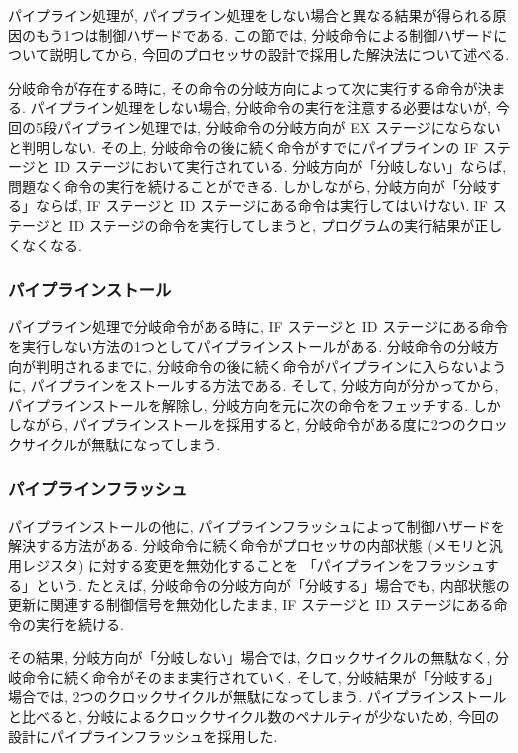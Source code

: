 \documentclass[../specifications.tex]{subfiles}
\begin{document}
  パイプライン処理が, 
  パイプライン処理をしない場合と異なる結果が得られる原因のもう1つは制御ハザードである.
  この節では, 分岐命令による制御ハザードについて説明してから, 
  今回のプロセッサの設計で採用した解決法について述べる.

  分岐命令が存在する時に, その命令の分岐方向によって次に実行する命令が決まる.
  パイプライン処理をしない場合, 分岐命令の実行を注意する必要はないが, 
  今回の5段パイプライン処理では, 分岐命令の分岐方向が EX ステージにならないと判明しない.
  その上, 分岐命令の後に続く命令がすでにパイプラインの IF ステージと ID ステージにおいて実行されている.
  分岐方向が「分岐しない」ならば, 問題なく命令の実行を続けることができる.
  しかしながら, 分岐方向が「分岐する」ならば, IF ステージと ID ステージにある命令は実行してはいけない.
  IF ステージと ID ステージの命令を実行してしまうと, プログラムの実行結果が正しくなくなる.

  \subsubsection{パイプラインストール}
  パイプライン処理で分岐命令がある時に, 
  IF ステージと ID ステージにある命令を実行しない方法の1つとしてパイプラインストールがある.
  分岐命令の分岐方向が判明されるまでに, 分岐命令の後に続く命令がパイプラインに入らないように, 
  パイプラインをストールする方法である.
  そして, 分岐方向が分かってから, パイプラインストールを解除し, 
  分岐方向を元に次の命令をフェッチする.
  しかしながら, パイプラインストールを採用すると, 
  分岐命令がある度に2つのクロックサイクルが無駄になってしまう.

  \subsubsection{パイプラインフラッシュ}
  パイプラインストールの他に, パイプラインフラッシュによって制御ハザードを解決する方法がある.
  分岐命令に続く命令がプロセッサの内部状態 (メモリと汎用レジスタ) に対する変更を無効化することを
  「パイプラインをフラッシュする」という.
  たとえば, 分岐命令の分岐方向が「分岐する」場合でも, 
  内部状態の更新に関連する制御信号を無効化したまま, 
  IF ステージと ID ステージにある命令の実行を続ける.

  その結果, 分岐方向が「分岐しない」場合では, クロックサイクルの無駄なく, 
  分岐命令に続く命令がそのまま実行されていく.
  そして, 分岐結果が「分岐する」場合では, 2つのクロックサイクルが無駄になってしまう.
  パイプラインストールと比べると, 分岐によるクロックサイクル数のペナルティが少ないため, 
  今回の設計にパイプラインフラッシュを採用した.
\end{document}
